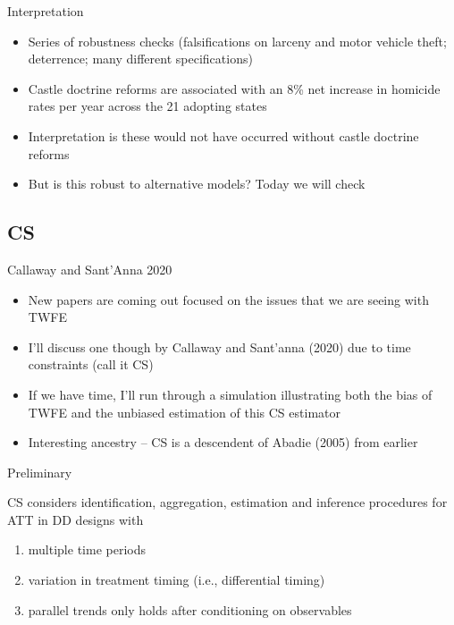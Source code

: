 \documentclass{beamer}
\begin{document}
\begin{frame}{Interpretation}
	
	\begin{itemize}
	\item Series of robustness checks (falsifications on larceny and motor vehicle theft; deterrence; many different specifications)
	\item Castle doctrine reforms are associated with an 8\% net increase in homicide rates per year across the 21 adopting states
	\item Interpretation is these would not have occurred without castle doctrine reforms
	\item But is this robust to alternative models? Today we will check
	\end{itemize}
\end{frame}






\subsection{CS}

\begin{frame}{Callaway and Sant'Anna 2020}

\begin{itemize}
\item New papers are coming out focused on the issues that we are seeing with TWFE
\item I'll discuss one though by Callaway and Sant'anna (2020) due to time constraints (call it CS)
\item If we have time, I'll run through a simulation illustrating both the bias of TWFE and the unbiased estimation of this CS estimator
\item Interesting ancestry -- CS is a descendent of Abadie (2005) from earlier

\end{itemize}

\end{frame}

\begin{frame}{Preliminary}

CS considers identification, aggregation, estimation and inference procedures for ATT in DD designs with

\begin{enumerate}
\item multiple time periods
\item variation in treatment timing (i.e., differential timing)
\item parallel trends only holds after conditioning on observables
\end{enumerate}

\end{frame}
\end{document}

